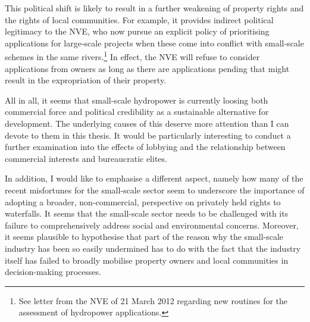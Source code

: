 This political shift is likely to result in a further weakening of property rights and the rights of local communities. For example, it provides indirect political legitimacy to the NVE, who now pursue an explicit policy of prioritising applications for large-scale projects when these come into conflict with small-scale schemes in the same rivers.\footnote{See letter from the NVE of 21 March 2012 regarding new routines for the assessment of hydropower applications.} In effect, the NVE will refuse to consider applications from owners as long as there are applications pending that might result in the expropriation of their property.

All in all, it seems that small-scale hydropower is currently loosing both commercial force and political credibility as a sustainable alternative for development. The underlying causes of this deserve more attention than I can devote to them in this thesis. It would be particularly interesting to conduct a further examination into the effects of lobbying and the relationship between commercial interests and bureaucratic elites.

In addition, I would like to emphasise a different aspect, namely how many of the recent misfortunes for the small-scale sector seem to underscore the importance of adopting a broader, non-commercial, perspective on privately held rights to waterfalls. It seems that the small-scale sector needs to be challenged with its failure to comprehensively address social and environmental concerns. Moreover, it seems plausible to hypothesise that part of the reason why the small-scale industry has been so easily undermined has to do with the fact that the industry itself has failed to broadly mobilise property owners and local communities in decision-making processes.

